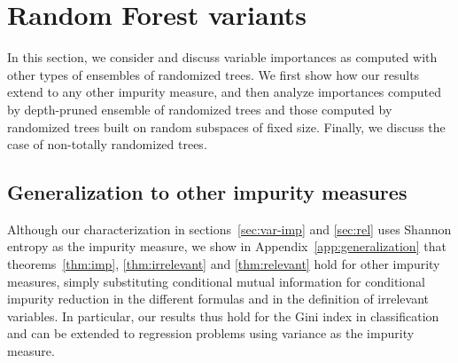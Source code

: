 \documentclass{article}
\begin{document}





\section{Random Forest variants}
\label{sec:variants}

In this section, we consider and discuss variable importances as computed with
other types of ensembles of randomized trees. We first show how our results extend to any other impurity measure, and then analyze importances computed by depth-pruned ensemble of randomized trees and those
computed by randomized trees built on random subspaces of fixed size. Finally, we
discuss the case of non-totally randomized trees.

\subsection{Generalization to other impurity measures}

Although our characterization in sections~\ref{sec:var-imp} and
\ref{sec:rel} uses Shannon entropy as the impurity measure, we show in
Appendix~\ref{app:generalization} that theorems~\ref{thm:imp},
\ref{thm:irrelevant} and \ref{thm:relevant} hold for other impurity
measures, simply substituting conditional mutual information for
conditional impurity reduction in the different formulas and in
the definition of irrelevant variables.  In particular, our results
thus hold for the Gini index in classification and can be extended to
regression problems using variance as the impurity measure.

\end{document}
